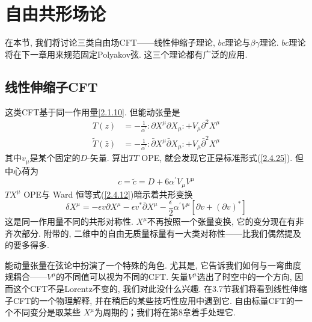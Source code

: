 \section{\texorpdfstring{自由共形场论}{2.5 Free CFTs}}
在本节, 我们将讨论三类自由场CFT——线性伸缩子理论, $bc$理论与$\beta\gamma$理论. $bc$理论将在下一章用来规范固定Polyakov弦. 这三个理论都有广泛的应用.

\subsection*{线性伸缩子CFT}

这类CFT基于同一作用量\eqref{2.1.10}. 但能动张量是
\begin{subequations} \label{2.5.1}
\begin{align}
T(z)&=-\frac{1}{\alpha^{\prime}}: \mathrel{\partial X^{\mu} \partial X_{\mu}}:+ V_{\mu} \partial^{2} X^{\mu} \label{2.5.1a} \\
\tilde{T}(\bar{z})&=-\frac{1}{\alpha^{\prime}}: \mathrel{\bar{\partial} X^{\mu} \bar{\partial} X_{\mu}}:+V_{\mu} \bar{\partial}^{2} X^{\mu}
\label{2.5.1b}
\end{align}
\end{subequations}
其中$v_\mu$是某个固定的$D$-矢量. 算出$TT$ OPE, 就会发现它正是标准形式(\ref{2.4.25}). 但中心荷为
\begin{equation}
c=\tilde{c}=D+6 \alpha^{\prime} V_{\mu} V^{\mu}
\end{equation}
$TX^\mu $ OPE与 Ward 恒等式(\ref{2.4.12})暗示着共形变换
\begin{equation}
\delta X^{\mu}=-\epsilon v \partial X^{\mu}-\epsilon v^{*} \bar{\partial} X^{\mu}-\frac{\epsilon}{2} \alpha^{\prime} V^{\mu}\left[\partial v+(\partial v)^{*}\right]
\end{equation}
这是同一作用量不同的共形对称性. $X^\mu$不再按照一个张量变换, 它的变分现在有非齐次部分. 附带的, 二维中的自由无质量标量有一大类对称性——比我们偶然提及的要多得多. 

能动量张量在弦论中扮演了一个特殊的角色. 尤其是, 它告诉我们如何与一弯曲度规耦合——$V^\mu$的不同值可以视为不同的CFT. 矢量$V^\mu$选出了时空中的一个方向, 因而这个CFT不是Lorentz不变的, 我们对此没什么兴趣. 在3.7节我们将看到线性伸缩子CFT的一个物理解释, 并在稍后的某些技巧性应用中遇到它. 自由标量CFT的一个不同变分是取某些  $X^\mu$为周期的；我们将在第8章着手处理它.

